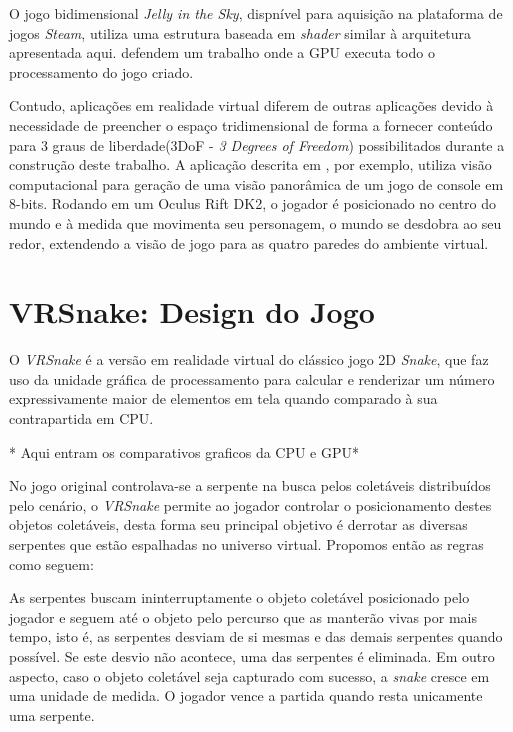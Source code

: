 \documentclass[conference]{IEEEtran}
\begin{document}
O jogo bidimensional \textit{Jelly in the Sky}, dispnível para aquisição na plataforma de jogos \textit{Steam}, utiliza uma estrutura baseada em \textit{shader} similar à arquitetura apresentada aqui. \cite{GPGPUWars} defendem um trabalho onde a GPU executa todo o processamento do jogo criado.

Contudo, aplicações em realidade virtual diferem de outras aplicações devido à necessidade de preencher o espaço tridimensional de forma a fornecer conteúdo para 3 graus de liberdade(3DoF - \textit{3 Degrees of Freedom}) possibilitados durante a construção deste trabalho. A aplicação descrita em \cite{zund2015unfolding}, por exemplo, utiliza visão computacional para geração de uma visão panorâmica de um jogo de console em 8-bits. Rodando em um Oculus Rift DK2, o jogador é posicionado no centro do mundo e à medida que movimenta seu personagem, o mundo se desdobra ao seu redor, extendendo a visão de jogo para as quatro paredes do ambiente virtual.

\section{VRSnake: Design do Jogo} \label{sec:vrsnake}
O \textit{VRSnake} é a versão em realidade virtual do clássico jogo 2D \textit{Snake}, que faz uso da unidade gráfica de processamento para calcular e renderizar um número expressivamente maior de elementos em tela quando comparado à sua contrapartida em CPU. 

* Aqui entram os comparativos graficos da CPU e GPU*

No jogo original controlava-se a serpente na busca pelos coletáveis distribuídos pelo cenário, o \textit{VRSnake} permite ao jogador controlar o posicionamento destes objetos coletáveis, desta forma seu principal objetivo é derrotar as diversas serpentes que estão espalhadas no universo virtual. Propomos então as regras como seguem:

As serpentes buscam ininterruptamente o objeto coletável posicionado pelo jogador e seguem até o objeto pelo percurso que as manterão vivas por mais tempo, isto é, as serpentes desviam de si mesmas e das demais serpentes quando possível. Se este desvio não acontece, uma das serpentes é eliminada. Em outro aspecto, caso o objeto coletável seja capturado com sucesso, a \textit{snake} cresce em uma unidade de medida. O jogador vence a partida quando resta unicamente uma serpente.

\end{document}
